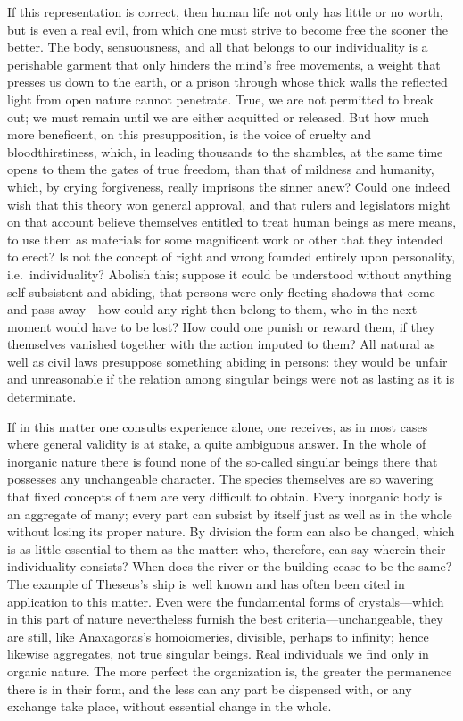 \documentclass[12pt,a4paper]{article}
\begin{document}
If this representation is correct, then human life not only has little or no
worth, but is even a real evil, from which one must strive to become free the
sooner the better. The body, sensuousness, and all that belongs to our
individuality is a perishable garment that only hinders the mind's free
movements, a weight that presses us down to the earth, or a prison through whose
thick walls the reflected light from open nature cannot penetrate. True, we are
not permitted to break out; we must remain until we are either acquitted or
released. But how much more beneficent, on this presupposition, is the voice of
cruelty and bloodthirstiness, which, in leading thousands to the shambles, at
the same time opens to them the gates of true freedom, than that of mildness and
humanity, which, by crying forgiveness, really imprisons the sinner anew? Could
one indeed wish that this theory won general approval, and that rulers and
legislators might on that account believe themselves entitled to treat human
beings as mere means, to use them as materials for some magnificent work or
other that they intended to erect? Is not the concept of right and wrong founded
entirely upon personality, i.e.\ individuality? Abolish this; suppose it could
be understood without anything self-subsistent and abiding, that persons were
only fleeting shadows that come and pass away---how could any right then belong
to them, who in the next moment would have to be lost? How could one punish or
reward them, if they themselves vanished together with the action imputed to
them? All natural as well as civil laws presuppose something abiding in persons:
they would be unfair and unreasonable if the relation among singular beings were
not as lasting as it is determinate.

If in this matter one consults experience alone, one receives, as in most cases
where general validity is at stake, a quite ambiguous answer. In the whole of
inorganic nature there is found none of the so-called singular beings there that
possesses any unchangeable character. The species themselves are so wavering
that fixed concepts of them are very difficult to obtain. Every inorganic body
is an aggregate of many; every part can subsist by itself just as well as in the
whole without losing its proper nature. By division the form can also be
changed, which is as little essential to them as the matter: who, therefore, can
say wherein their individuality consists? When does the river or the building
cease to be the same? The example of Theseus's ship is well known and has often
been cited in application to this matter. Even were the fundamental forms of
crystals---which in this part of nature nevertheless furnish the best
criteria---unchangeable, they are still, like Anaxagoras's homoiomeries,
divisible, perhaps to infinity; hence likewise aggregates, not true singular
beings. Real individuals we find only in organic nature. The more perfect the
organization is, the greater the permanence there is in their form, and the less
can any part be dispensed with, or any exchange take place, without essential
change in the whole.
\end{document}
